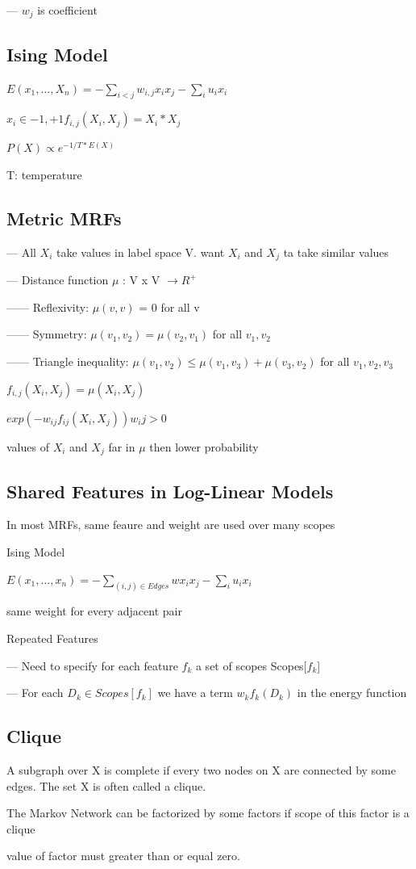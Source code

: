 \documentclass{book}
\begin{document}
--- $w_j$ is coefficient

\subsection{Ising Model}

$E(x_1,...,X_n) = - \sum_{i<j} w_{i,j}x_i x_j - \sum_i u_i x_i$

$x_i \in {-1,+1} f_{i,j}(X_i, X_j) = X_i * X_j $

$P(X) \propto e^{-1/T * E(X)} $

T: temperature 

\subsection{Metric MRFs}

--- All $X_i$ take values in label space V. want $X_i$ and $X_j$ ta take similar values

--- Distance function $\mu$ : V x V $ \rightarrow R^+$

------ Reflexivity: $\mu(v,v)$ = 0 for all v

------ Symmetry: $\mu(v_1,v_2) = \mu(v_2,v_1)$ for all $v_1, v_2$

------ Triangle inequality: $\mu(v_1,v_2) \leq \mu(v_1,v_3) + \mu(v_3,v_2)$ for all $v_1,v_2,v_3$

$f_{i,j}(X_i,X_j) = \mu(X_i,X_j) $

$exp(-w_{ij}f_{ij}(X_i,X_j)) w_ij > 0$

values of $X_i$ and $X_j$ far in $\mu$ then lower probability

\subsection{Shared Features in Log-Linear Models}
 In most MRFs, same feaure and weight are used over many scopes
 
 Ising Model
 
 $E(x_1,...,x_n) = - \sum_{(i,j) \in Edges} w x_i x_j - \sum_i u_i x_i$
 
 same weight for every adjacent pair
 
 Repeated Features
 
 --- Need to specify for each feature $f_k$ a set of scopes Scopes[$f_k$]
 
 --- For each $D_k \in Scopes[f_k]$ we have a term $w_kf_k(D_k)$ in the energy function
 
\subsection{Clique}

A subgraph over X is complete if every two nodes on X are connected by some edges. The set X is often called a clique.

The Markov Network can be factorized by some factors if scope of this factor is a clique

value of factor must greater than or equal zero.
\end{document}
